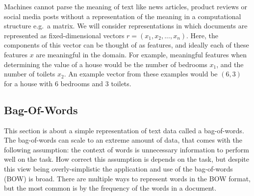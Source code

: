 Machines cannot parse the meaning of text like news articles, product reviews or social media posts  without a representation of the meaning in a computational structure e.g.\ a matrix.  We will consider representations in which documents are represented as fixed-dimensional vectors  $r = (x_1, x_2, ..., x_n)$. Here, the components of this vector can be thought of as features, and ideally each of these features $x$ are meaningful in the domain. For example, meaningful features when determining the  value of a house would be the number of bedrooms $x_1$, and the number of toilets $x_2$. An example vector from these examples would be $(6,3)$ for a house with 6 bedrooms and 3 toilets. 








\subsection{Bag-Of-Words}\label{bg:BOW}
This section is about a simple representation of text data called a bag-of-words. The bag-of-words can scale to an extreme amount of data, that comes with the following assumption: the context of words is unnecessary information to perform well on the task. How correct this assumption is depends on the task, but despite this view being overly-simplistic the application and use of the bag-of-words (BOW) is broad. There are multiple ways to represent words in the BOW format, but the most common is by the frequency of the words in a document.

